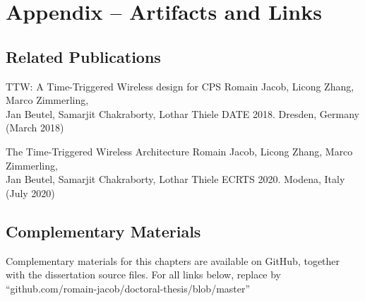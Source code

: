 \section{Appendix -- Artifacts and Links}
\label{appendix:ttw_artifacts}

\subsection{Related Publications}

\inlineRef%
{TTW: A Time-Triggered Wireless design for CPS}%
{Romain Jacob, Licong Zhang, Marco Zimmerling, \\Jan Beutel, Samarjit Chakraborty, Lothar Thiele}%
{DATE 2018. Dresden, Germany (March 2018)}


\inlineRef%
{The Time-Triggered Wireless Architecture}%
{Romain Jacob, Licong Zhang, Marco Zimmerling, \\Jan Beutel, Samarjit Chakraborty, Lothar Thiele}%
{ECRTS 2020. Modena, Italy (July 2020)}


\subsection{Complementary Materials}
Complementary materials for this chapters are available on GitHub, together with the dissertation source files. For all links below, replace
\linkroot  by ``{github.com/romain-jacob/doctoral-thesis/blob/master}''




